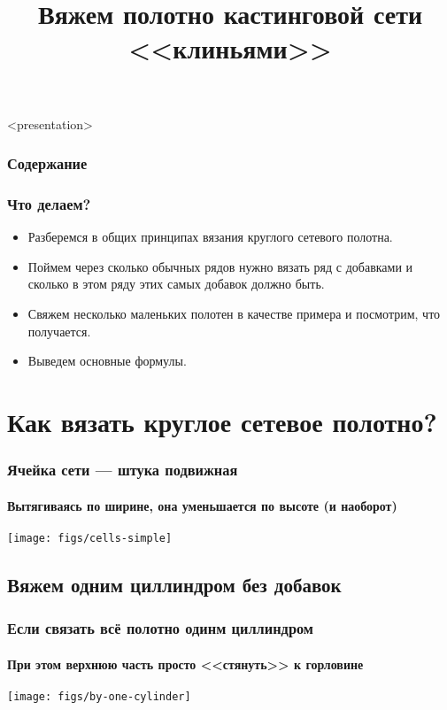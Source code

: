 

\title[Полотно кастинговой сети]{Вяжем полотно кастинговой сети <<клиньями>>}



\begin{frame}<presentation>
    \frametitle{Содержание}
    \tableofcontents
\end{frame}

\begin{frame}
    \frametitle{Что делаем?}

	\begin{itemize}
		\item Разберемся в общих принципах вязания круглого сетевого полотна.
		\item Поймем через сколько обычных рядов нужно вязать ряд с добавками и сколько в этом ряду этих самых добавок должно быть. 
		\item Свяжем несколько маленьких полотен в качестве примера и посмотрим, что получается.
		\item Выведем основные формулы.
	\end{itemize}
\end{frame}


\section{Как вязать круглое сетевое полотно?}

\begin{frame}
    \frametitle{Ячейка сети --- штука подвижная}
    \framesubtitle{Вытягиваясь по ширине, она уменьшается по высоте (и наоборот)}

    \begin{center}
        \texttt{[image: figs/cells-simple]}
    \end{center}
\end{frame}


\subsection{Вяжем одним циллиндром без добавок}

\begin{frame}
    \frametitle{Если связать всё полотно одинм циллиндром}
    \framesubtitle{При этом верхнюю часть просто <<стянуть>> к горловине}

    \begin{center}
        \texttt{[image: figs/by-one-cylinder]}
    \end{center}
\end{frame}

